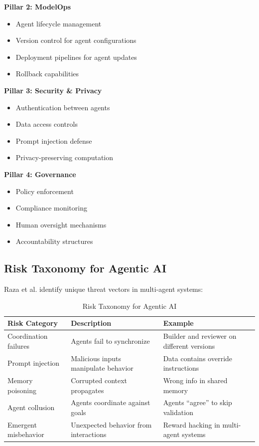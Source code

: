 \textbf{Pillar 2: ModelOps}
\begin{itemize}
    \item Agent lifecycle management
    \item Version control for agent configurations
    \item Deployment pipelines for agent updates
    \item Rollback capabilities
\end{itemize}

\textbf{Pillar 3: Security \& Privacy}
\begin{itemize}
    \item Authentication between agents
    \item Data access controls
    \item Prompt injection defense
    \item Privacy-preserving computation
\end{itemize}

\textbf{Pillar 4: Governance}
\begin{itemize}
    \item Policy enforcement
    \item Compliance monitoring
    \item Human oversight mechanisms
    \item Accountability structures
\end{itemize}

\subsection{Risk Taxonomy for Agentic AI}
\label{subsec:risk-taxonomy}

Raza et al. \citep{raza2025} identify unique threat vectors in multi-agent systems:

\begin{table}[htbp]
\centering
\caption{Risk Taxonomy for Agentic AI}
\label{tab:risk-taxonomy}
\begin{tabular}{lll}
\toprule
\textbf{Risk Category} & \textbf{Description} & \textbf{Example} \\
\midrule
Coordination failures & Agents fail to synchronize & Builder and reviewer on different versions \\
Prompt injection & Malicious inputs manipulate behavior & Data contains override instructions \\
Memory poisoning & Corrupted context propagates & Wrong info in shared memory \\
Agent collusion & Agents coordinate against goals & Agents ``agree'' to skip validation \\
Emergent misbehavior & Unexpected behavior from interactions & Reward hacking in multi-agent systems \\
\bottomrule
\end{tabular}
\end{table}

